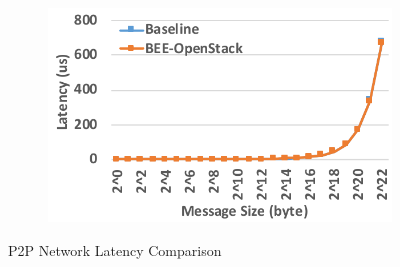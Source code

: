 \begin{figure}[t]
\begin{subfigure}[t]{0.245\textwidth}
    \end{subfigure}
    \begin{subfigure}[t]{0.245\textwidth}
        \includegraphics[width=\textwidth]{figures/lat-bee-os.pdf}
    \end{subfigure}
    \caption{P2P Network Latency Comparison}
    \label{net-lat}
\end{figure}


